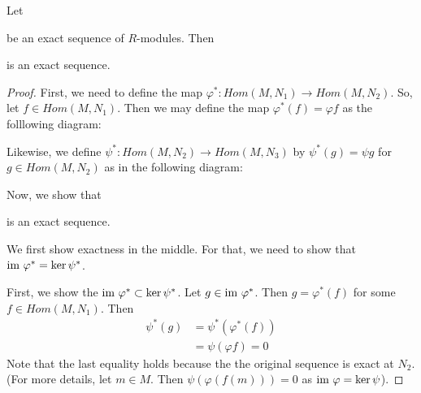 \begin{proposition}
    Let
    be an exact sequence of $R$-modules. Then \\
    is an exact sequence.
    \label{prop:homological-left-zero}
\end{proposition}
\begin{proof}
    First, we need to define the map $\varphi ^{*} : Hom (M, N_1 ) \to Hom (M, N_2)$. So, let $f \in Hom \left( M, N_1 \right)$. Then we may define the map $\varphi ^{*} (f) = \varphi f$ as the folllowing diagram:
    Likewise, we define $\psi^{*} : Hom (M, N_2 ) \to Hom (M, N_3)$ by $\psi ^{*} (g) = \psi g$ for $g\in Hom (M, N_2)$ as in the following diagram: 

    Now, we show that  is an exact sequence.

    We first show exactness in the middle. For that, we need to show that ${\text{im }} \varphi^{*} = \ker \psi ^{*}$.

    First, we show the ${\text{im }} \varphi ^{*} \subset \ker \psi ^{*}$. Let $g \in {\text{im }} \varphi ^{*}$. Then $g = \varphi ^{*} \left( f \right)$ for some $f\in Hom (M, N_1)$. Then 
    \begin{align*}
	\psi ^{*} (g) &= \psi ^{*} (\varphi ^{*} (f)) \\
	&= \psi (\varphi f) = 0
    \end{align*}
    Note that the last equality holds because the the original sequence is exact at $N_2$. (For more details, let $m \in M$. Then $\psi ( \varphi (f(m)))= 0$ as ${\text{im }} \varphi = \ker \psi$).


\end{proof}
